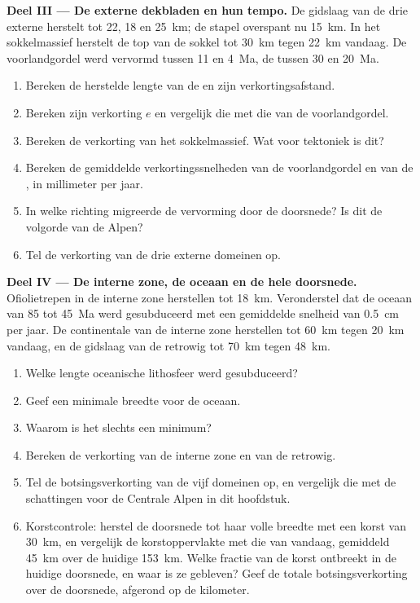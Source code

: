 \begin{problem}
\noindent\textbf{Deel III --- De externe dekbladen en hun tempo.} De gidslaag van de
drie externe  herstelt tot 22, 18 en \qty{25}{km}; de stapel overspant nu
\qty{15}{km}. In het sokkelmassief herstelt de top van de sokkel tot \qty{30}{km}
tegen \qty{22}{km} vandaag. De voorlandgordel werd vervormd tussen 11 en \qty{4}{Ma}, de
 tussen 30 en \qty{20}{Ma}.
\begin{enumerate}[resume]
\item Bereken de herstelde lengte van de  en zijn verkortingsafstand.
\item Bereken zijn verkorting $e$ en vergelijk die met die van de voorlandgordel.
\item Bereken de verkorting van het sokkelmassief. Wat voor tektoniek is dit?
\item Bereken de gemiddelde verkortingssnelheden van de voorlandgordel en van de , in
millimeter per jaar.
\item In welke richting migreerde de vervorming door de doorsnede? Is dit de volgorde
van de Alpen?
\item Tel de verkorting van de drie externe domeinen op.
\end{enumerate}

\noindent\textbf{Deel IV --- De interne zone, de oceaan en de hele doorsnede.}
Ofiolietrepen in de interne zone herstellen tot \qty{18}{km}. Veronderstel dat de oceaan
van 85 tot \qty{45}{Ma} werd gesubduceerd met een gemiddelde snelheid van \qty{0.5}{cm} per jaar. De continentale
 van de interne zone herstellen tot \qty{60}{km} tegen \qty{20}{km} vandaag, en de
gidslaag van de retrowig tot \qty{70}{km} tegen \qty{48}{km}.
\begin{enumerate}[resume]
\item Welke lengte oceanische lithosfeer werd gesubduceerd?
\item Geef een minimale breedte voor de oceaan.
\item Waarom is het slechts een minimum?
\item Bereken de verkorting van de interne zone en van de retrowig.
\item Tel de botsingsverkorting van de vijf domeinen op, en vergelijk die met de
schattingen voor de Centrale Alpen in dit hoofdstuk.
\item Korstcontrole: herstel de doorsnede tot haar volle breedte met een korst van \qty{30}{km}, en
vergelijk de korstoppervlakte met die van vandaag, gemiddeld \qty{45}{km} over de huidige
\qty{153}{km}. Welke fractie van de korst ontbreekt in de huidige doorsnede, en waar
is ze gebleven? Geef de totale botsingsverkorting over de doorsnede, afgerond op de
kilometer.
\end{enumerate}
\end{problem}
